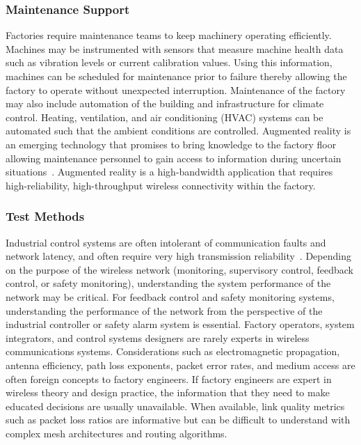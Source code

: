     \subsubsection{Maintenance Support}  
    Factories require maintenance teams to keep machinery operating efficiently.  Machines may be instrumented with sensors that measure machine health data such as vibration levels or current calibration values.  Using this information, machines can be scheduled for maintenance prior to failure thereby allowing the factory to operate without unexpected interruption.  Maintenance of the factory may also include automation of the building and infrastructure for climate control.  Heating, ventilation, and air conditioning (HVAC) systems can be automated such that the ambient conditions are controlled.  Augmented reality is an emerging technology that promises to bring knowledge to the factory floor allowing maintenance personnel to gain access to information during uncertain situations~\cite{Paelke2014}.  Augmented reality is a high-bandwidth application that requires high-reliability, high-throughput wireless connectivity within the factory.
    
    \subsubsection{Test Methods}  
Industrial control systems are often intolerant of communication faults and network latency, and often require very high transmission reliability~\cite{Zhang2013}. Depending on the purpose of the wireless network (monitoring, supervisory control, feedback control, or safety monitoring), understanding the system performance of the network may be critical. For feedback control and safety monitoring systems, understanding the performance of the network from the perspective of the industrial controller or safety alarm system is essential. Factory operators, system integrators, and control systems designers are rarely experts in wireless communications systems.  Considerations such as electromagnetic propagation, antenna efficiency, path loss exponents, packet error rates, and medium access are often foreign concepts to factory engineers.  If factory engineers are expert in wireless theory and design practice, the information that they need to make educated decisions are usually unavailable.  When available, link quality metrics such as packet loss ratios are informative but can be difficult to understand with complex mesh architectures and routing algorithms.

